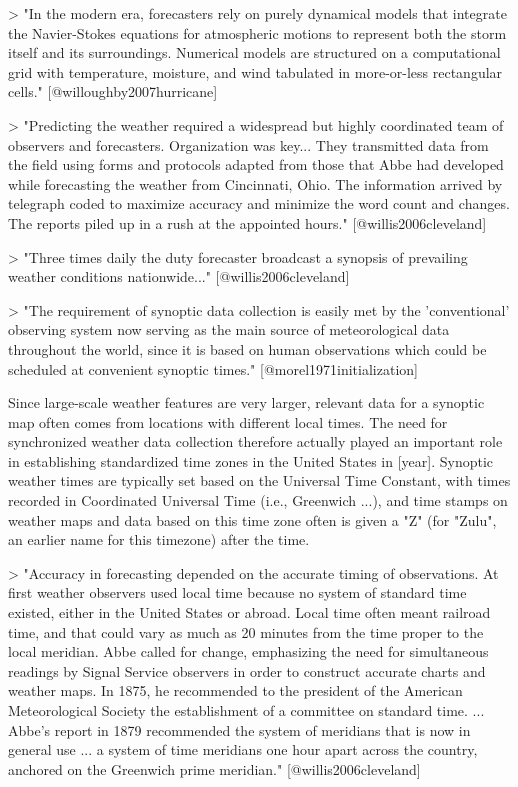 > "In the modern era, forecasters rely on purely dynamical models that integrate
the Navier-Stokes equations for atmospheric motions to represent both the storm
itself and its surroundings. Numerical models are structured on a computational
grid with temperature, moisture, and wind tabulated in more-or-less rectangular
cells." [@willoughby2007hurricane]

> "Predicting the weather required a widespread but highly coordinated team of
observers and forecasters. Organization was key... They transmitted data from
the field using forms and protocols adapted from those that Abbe had developed
while forecasting the weather from Cincinnati, Ohio. The information arrived by
telegraph coded to maximize accuracy and minimize the word count and changes.
The reports piled up in a rush at the appointed hours." [@willis2006cleveland]

> "Three times daily the duty forecaster broadcast a synopsis of prevailing
weather conditions nationwide..." [@willis2006cleveland]

> "The requirement of synoptic data collection is easily met by the
'conventional' observing system now serving as the main source of meteorological 
data throughout the world, since it is based on human observations which could 
be scheduled at convenient synoptic times." [@morel1971initialization]

Since large-scale weather features are very larger, relevant data for a synoptic
map often comes from locations with different local times. The need for
synchronized weather data collection therefore actually played an important role
in establishing standardized time zones in the United States in [year]. Synoptic
weather times are typically set based on the Universal Time Constant, with times
recorded in Coordinated Universal Time (i.e., Greenwich ...), and time stamps on
weather maps and data based on this time zone often is given a "Z" (for "Zulu",
an earlier name for this timezone) after the time.

> "Accuracy in forecasting depended on the accurate timing of observations. At
first weather observers used local time because no system of standard time
existed, either in the United States or abroad. Local time often meant railroad
time, and that could vary as much as 20 minutes from the time proper to the
local meridian. Abbe called for change, emphasizing the need for simultaneous
readings by Signal Service observers in order to construct accurate charts and
weather maps. In 1875, he recommended to the president of the American
Meteorological Society the establishment of a committee on standard time. ...
Abbe's report in 1879 recommended the system of meridians that is now in general
use ... a system of time meridians one hour apart across the country, anchored
on the Greenwich prime meridian." [@willis2006cleveland]

